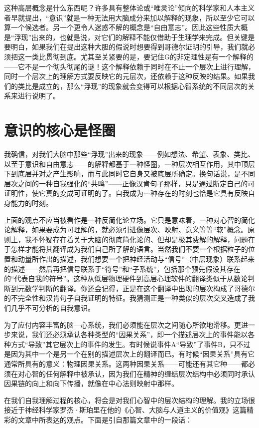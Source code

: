 这种高层概念是什么东西呢？许多具有整体论或“唯灵论”倾向的科学家和人本主义者早就提出，“意识”就是一种无法用大脑成分来加以解释的现象，所以至少它可以算一个候选者。另一个更令人迷惑不解的概念是“自由意志”。因此这些性质大概是“浮现”出来的，也就是说，对它们的解释不能仅借助于生理学来完成。但关键是要明白，如果我们在提出这种大胆的假说时想要得到哥德尔证明的引导，我们就必须把这一类比贯彻到底。尤其至关紧要的是，要记住G的非定理性是有一个解释的——它不是一个彻头彻尾的谜！这个解释依赖于同时在不止一个层次上进行理解，同时一个层次上的理解方式要反映它的元层次，还依赖于这种反映的结果。如果我们的类比是成立的，那么“浮现”的现象就会变得可以根据心智系统的不同层次的关系来进行说明了。

\section{意识的核心是怪圈}

我确信，对我们大脑中那些“浮现”出来的现象——例如想法、希望、表象、类比、以至于意识和自由意志——的解释都基于一种怪圈，一种层次相互作用，其中顶层下到底层并对之产生影响，而与此同时它自身又被底层所确定。换句话说，是不同层次之间的一种自我强化的“共鸣”——正像汉肯句子那样，只是通过断定自己的可证明性，使它真的变成可证明的了。自我成为一种存在的时刻也恰是它具有反映自身能力的时刻。

上面的观点不应当被看作是一种反简化论立场。它只是意味着，一种对心智的简化论解释，如果要成为可理解的，就必须引进像层次、映射、意义等等“软”概念。原则上，我不怀疑存在着关于大脑的彻底简化论的、但却是极其费解的解释，问题在于怎样才能将其翻译成为我们自己所了解的语言。当然我们不要一个根据粒子的位置和动量所作出的描述，我们想要一个把神经活动与“信号”（中层现象）联系起来的描述——然后再把信号联系于“符号”和“子系统”，包括那个预先假设其存在的“代表自我的符号”。这种从低层物理硬件到高层心理软件的翻译类似于从数论判断到元数学判断的翻译。你还会记得，正是在这个翻译中出现的层次构成了哥德尔的不完全性和汉肯句子自我证明的特征。我猜测正是一种类似的层次交叉造成了我们几乎不可分析的自我意识。

为了应付内容丰富的脑—心系统，我们必须能在层次之间随心所欲地滑移。更进一步来说，我们还必须承认各种类型的“因果关系”，即一个描述层次上的事件能以各种方式“导致”其它层次上的事件的发生。有时候说事件A“导致”了事件B，只不过是因为其中一个是另一个在别的描述层次上的翻译而已。有时候“因果关系”具有它通常所具有的意义：物理因果关系。这两种因果关系——可能还有其它种——都必须在对心智的任何解释中被承认，因为我们在精神的缠结层次结构中必须同时承认因果链的向上和向下传播，就像在中心法则映射中那样。

在我们自我理解过程的核心，将会是对我们心智中的层次结构的理解。我的立场很接近于神经科学家罗杰·斯珀里在他的《心智、大脑与人道主义的价值观》这篇精彩的文章中所表达的观点。下面是引自那篇文章中的一段话：

